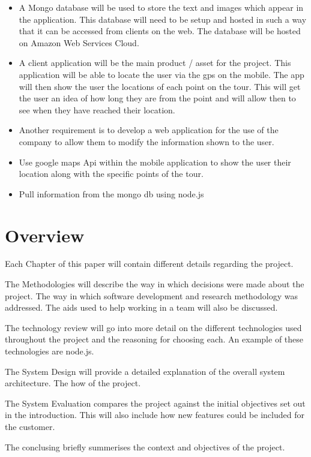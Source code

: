 \begin{itemize}
\item A Mongo database will be used to store the text and images which appear in the application. This database will need to be setup and hosted in such a way that it can be accessed from clients on the web. The database will be hosted on Amazon Web Services Cloud.

\item A client application will be the main product / asset for the project. This application will be able to locate the user via the gps on the mobile. The app will then show the user the locations of each point on the tour. This will get the user an idea of how long they are from the point and will allow then to see when they have reached their location.

\item Another requirement is to develop a web application for the use of the company to allow them to modify the information shown to the user.

\item Use google maps Api within the mobile application to show the user their location along with the specific points of the tour.

\item Pull information from the mongo db using node.js


\end{itemize}
\section{Overview}

Each Chapter of this paper will contain different details regarding the project. 

The Methodologies will describe the way in which decisions were made about the project. The way in which software development and research methodology was addressed. The aids used to help working in a team will also be discussed.

The technology review will go into more detail on the different technologies used throughout the project and the reasoning for choosing each. An example of these technologies are node.js.

The System Design will provide a detailed explanation of the overall system architecture. The how of the project.

The System Evaluation compares the project against the initial objectives set out in the introduction. This will also include how new features could be included for the customer.

The conclusing briefly summerises the context and objectives of the project.
 


